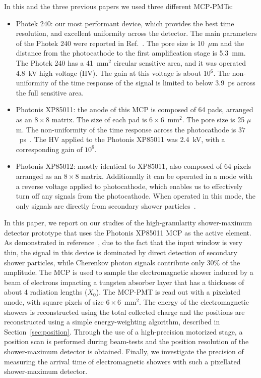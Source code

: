 \documentclass[12pt]{article}
\begin{document}
In this and the three previous papers we used three different MCP-PMTs:
\begin{itemize}
\item Photek 240: our most performant device, which provides the best
      time resolution, and excellent uniformity across the detector. The main parameters
      of the Photek 240 were reported in Ref.~\cite{MCPFastCaloNIMA}. The pore
      size is 10~$\mu$m and the distance from the photocathode to the first
      amplification stage is 5.3~mm. The Photek 240 has a 41~mm$^2$ circular
      sensitive area, and it was operated 4.8~kV high voltage (HV). The gain at
      this voltage is about 10$^6$. The non-uniformity of the time response of the signal 
      is limited to below 3.9~ps across the full sensitive area.
\item Photonis XP85011: the anode of this MCP is composed of 64 pads, arranged
      as an $8\times8$ matrix. The size of each pad is $6\times6$~$\mathrm{mm}^{2}$. 
      The pore size is 25 $\mu$m. The non-uniformity  of the time response across the photocathode
      is $37$~ps~\cite{MCPFastCaloNIMA, Ronzhin2015288}. The HV applied to the Photonis XP85011 
      was 2.4~kV, with a corresponding gain of $10^6$. 
\item Photonis XP85012: mostly identical to XP85011, also composed of 64 pixels arranged as
      an $8\times8$ matrix. Additionally it can be operated in a mode with a reverse voltage applied 
      to photocathode, which enables us to effectively turn off any signals from 
      the photocathode. When operated in this mode, the only signals are 
      directly from secondary shower particles~\cite{Ronzhin:2015pba}.  
\end{itemize}

In this paper, we report on our studies of the high-granularity shower-maximum detector prototype 
that uses the Photonis XP85011 MCP as the active element. As demonstrated in 
reference~\cite{MCPFastCaloNIMA}, due to the fact that the input window is very thin, the signal in 
this device is dominated by direct detection of secondary shower particles, 
while Cherenkov photon signals contribute only $30\%$ of the amplitude.
The MCP is used to sample the electromagnetic shower induced by a beam of electrons impacting a 
tungsten absorber layer that has a thickness of about 4 radiation lengths ($X_{0}$). The
MCP-PMT is read out with a pixelated anode, with square pixels of size 
$6\times6$~$\mathrm{mm}^{2}$. The energy of the electromagnetic showers is reconstructed 
using the total collected charge and the positions are reconstructed using a simple
energy-weighting algorithm, described in Section~\ref{sec:position}.
Through the use of a high-precision motorized stage, a position scan is
performed during beam-tests and the position resolution of the shower-maximum
detector is obtained. Finally, we investigate the precision of measuring the
arrival time of electromagnetic showers with such a pixellated shower-maximum
detector.
\end{document}
